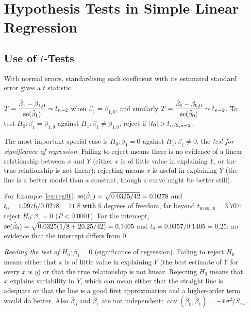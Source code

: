 \section{Hypothesis Tests in Simple Linear Regression}

\subsection{Use of $t$-Tests}

With normal errors, standardising each coefficient with its estimated standard error gives a $t$ statistic.

\begin{theorem}\label{thm:regt}
$T=\dfrac{\hat\beta_1-\beta_{1,0}}{\operatorname{se}(\hat\beta_1)}\sim t_{n-2}$ when $\beta_1=\beta_{1,0}$, and similarly $T=\dfrac{\hat\beta_0-\beta_{0,0}}{\operatorname{se}(\hat\beta_0)}\sim t_{n-2}$. To test $H_0:\beta_1=\beta_{1,0}$ against $H_1:\beta_1\ne\beta_{1,0}$, reject if $\lvert t_0\rvert>t_{\alpha/2,n-2}$.
\end{theorem}

The most important special case is $H_0:\beta_1=0$ against $H_1:\beta_1\ne0$, the \emph{test for significance of regression}. Failing to reject means there is no evidence of a linear relationship between $x$ and $Y$ (either $x$ is of little value in explaining $Y$, or the true relationship is not linear); rejecting means $x$ is useful in explaining $Y$ (the line is a better model than a constant, though a curve might be better still).

\begin{example}
For Example~\ref{ex:regfit}: $\operatorname{se}(\hat\beta_1)=\sqrt{0.0325/42}=0.0278$ and $t_0=1.9976/0.0278=71.8$ with $6$ degrees of freedom, far beyond $t_{0.005,6}=3.707$: reject $H_0:\beta_1=0$ ($P<0.0001$). For the intercept, $\operatorname{se}(\hat\beta_0)=\sqrt{0.0325(1/8+20.25/42)}=0.1405$ and $t_0=0.0357/0.1405=0.25$: no evidence that the intercept differs from $0$.
\end{example}

\emph{Reading the test of $H_0:\beta_1=0$} (significance of regression). Failing to reject $H_0$ means either that $x$ is of little value in explaining $Y$ (the best estimate of $Y$ for every $x$ is $\bar{y}$) or that the true relationship is not linear. Rejecting $H_0$ means that $x$ explains variability in $Y$, which can mean either that the straight line is adequate or that the line is a good first approximation and a higher-order term would do better. Also $\hat\beta_0$ and $\hat\beta_1$ are not independent: $\operatorname{cov}(\hat\beta_0,\hat\beta_1)=-\bar{x}\sigma^2/S_{xx}$.

